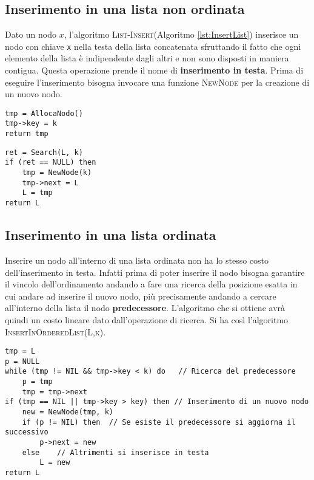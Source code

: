 \subsection{Inserimento in una lista non ordinata}

Dato un nodo $x$, l'algoritmo \textsc{List-Insert}(Algoritmo \ref{lst:InsertList}) inserisce un nodo con chiave \texttt{x} nella testa della lista concatenata sfruttando il fatto che ogni elemento della lista è indipendente dagli altri e non sono disposti in maniera contigua. Questa operazione prende il nome di \textbf{inserimento in testa}. Prima di eseguire l'inserimento bisogna invocare una funzione \textsc{NewNode} per la creazione di un nuovo nodo.
\begin{center}
\begin{minipage}{0.4\textwidth}
\begin{lstlisting}[label=lst:NewNode, language=asd, caption={NewNode(k)}]
tmp = AllocaNodo()
tmp->key = k
return tmp
\end{lstlisting}
\end{minipage}
\begin{minipage}{0.4\textwidth}
\begin{lstlisting}[label=lst:InsertList, language=asd, caption={Insert(L, k)}]
ret = Search(L, k)
if (ret == NULL) then
	tmp = NewNode(k)
	tmp->next = L
	L = tmp
return L
\end{lstlisting}
\end{minipage}
\end{center}
\subsection{Inserimento in una lista ordinata}
Inserire un nodo all'interno di una lista ordinata non ha lo stesso costo dell'inserimento in testa. Infatti prima di poter inserire il nodo bisogna garantire il vincolo dell'ordinamento andando a fare una ricerca della posizione esatta in cui andare ad inserire il nuovo nodo, più precisamente andando a cercare all'interno della lista il nodo \textbf{predecessore}. L'algoritmo che si ottiene avrà quindi un costo lineare dato dall'operazione di ricerca. Si ha così l'algoritmo \textsc{InsertInOrderedList(L,k)}.

\begin{lstlisting}[label=lst:InsertInOrderedList, language=asd, caption={InsertInOrderedList(L, k)}]
tmp = L
p = NULL
while (tmp != NIL && tmp->key < k) do	// Ricerca del predecessore
    p = tmp
    tmp = tmp->next
if (tmp == NIL || tmp->key > key) then // Inserimento di un nuovo nodo
    new = NewNode(tmp, k)
    if (p != NIL) then	// Se esiste il predecessore si aggiorna il successivo
        p->next = new
    else	// Altrimenti si inserisce in testa
        L = new
return L
\end{lstlisting}


